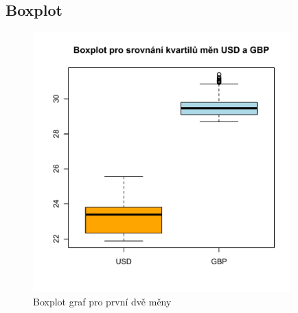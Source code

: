\documentclass[a4paper]{ article}
\begin{document}
\subsection{Boxplot}
\begin{figure}[H]
\centering
\includegraphics[width=10cm]{boxplot_graf.pdf}
\caption{Boxplot graf pro první dvě měny}
\end{figure}
\end{document}
